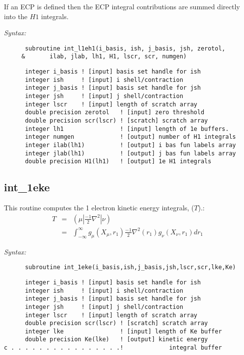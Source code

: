If an ECP is defined then the ECP integral contributions are summed  
directly into the $H1$ integrals.   
 
{\it Syntax:} 
\begin{verbatim} 
      subroutine int_l1eh1(i_basis, ish, j_basis, jsh, zerotol, 
     &       ilab, jlab, lh1, H1, lscr, scr, numgen)  
\end{verbatim} 
\begin{verbatim} 
      integer i_basis ! [input] basis set handle for ish 
      integer ish     ! [input] i shell/contraction 
      integer j_basis ! [input] basis set handle for jsh 
      integer jsh     ! [input] j shell/contraction 
      integer lscr    ! [input] length of scratch array 
      double precision zerotol   ! [input] zero threshold  
      double precision scr(lscr) ! [scratch] scratch array 
      integer lh1                ! [input] length of 1e buffers. 
      integer numgen             ! [output] number of H1 integrals 
      integer ilab(lh1)          ! [output] i bas fun labels array 
      integer jlab(lh1)          ! [output] j bas fun labels array 
      double precision H1(lh1)   ! [output] 1e H1 integrals 
\end{verbatim} 
\subsection{int\_1eke} 
This routine computes the 1 electron kinetic energy integrals, ($T$).: 
\begin{eqnarray*} 
T & = & ({\mu}|\frac{-1}{2}\nabla^{2}|{\nu}) \\ 
  & = & \int_{-\infty}^{\infty} g_{\mu}(X_{\mu},r_{1})\frac{-1}{2}\nabla^{2}(r_{1})g_{\nu}(X_{\nu},r_{1})dr_{1} 
\end{eqnarray*} 
 
{\it Syntax:} 
\begin{verbatim} 
      subroutine int_1eke(i_basis,ish,j_basis,jsh,lscr,scr,lke,Ke) 
\end{verbatim} 
\begin{verbatim} 
      integer i_basis ! [input] basis set handle for ish 
      integer ish     ! [input] i shell/contraction 
      integer j_basis ! [input] basis set handle for jsh 
      integer jsh     ! [input] j shell/contraction 
      integer lscr    ! [input] length of scratch array 
      double precision scr(lscr) ! [scratch] scratch array 
      integer lke                ! [input] length of Ke buffer 
      double precision Ke(lke)   ! [output] kinetic energy  
c . . . . . . . . . . . . . . . .!             integral buffer 
\end{verbatim} 
